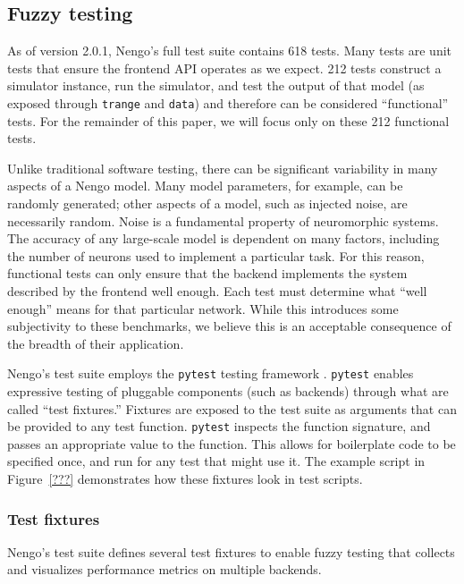 \documentclass{frontiersSCNS}
\begin{document}
\subsection{Fuzzy testing}

As of version 2.0.1, Nengo's full test suite contains 618 tests.
Many tests are unit tests
that ensure the frontend API operates as we expect.
212 tests construct a simulator instance,
run the simulator, and test the output of that model
(as exposed through \texttt{trange}
and \texttt{data})
and therefore can be considered ``functional'' tests.
For the remainder of this paper,
we will focus only on these 212 functional tests.

Unlike traditional software testing,
there can be significant variability
in many aspects of a Nengo model.
Many model parameters, for example,
can be randomly generated;
other aspects of a model,
such as injected noise,
are necessarily random.
Noise is a fundamental property
of neuromorphic systems.
The accuracy of any large-scale model
is dependent on many factors,
including the number of neurons used
to implement a particular task.
For this reason,
functional tests can only
ensure that the backend implements
the system described by the frontend
well enough.
Each test must determine what
``well enough'' means for that particular network.
While this introduces some subjectivity
to these benchmarks,
we believe this is an acceptable consequence
of the breadth of their application.

Nengo's test suite employs the \texttt{pytest}
testing framework \cite{???}.
\texttt{pytest} enables
expressive testing of pluggable components
(such as backends)
through what are called ``test fixtures.''
Fixtures are exposed to the test suite
as arguments that can be provided
to any test function.
\texttt{pytest} inspects the function signature,
and passes an appropriate value
to the function.
This allows for boilerplate code
to be specified once,
and run for any test that might use it.
The example script in Figure~\ref{???}
demonstrates how these fixtures
look in test scripts.

\subsubsection{Test fixtures}

Nengo's test suite defines several test fixtures
to enable fuzzy testing
that collects and visualizes performance metrics
on multiple backends.
\end{document}

